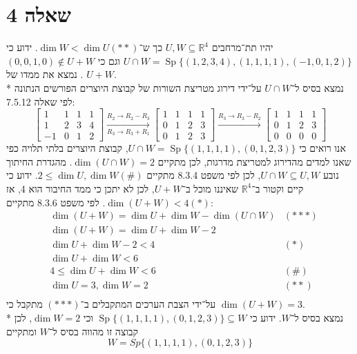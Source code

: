 \documentclass[a4paper]{article}
\DeclareMathOperator\Sp{Sp}
\def\RR{\mathbb{R}}
\begin{document}
\section{שאלה 4}
יהיו תת־מרחבים $U, W \subseteq \RR^4$ כך ש־$\dim W < \dim U (**)$.
ידוע כי $U \cap W = \Sp\{(1, 2, 3, 4), (1, 1, 1, 1), (-1, 0, 1, 2)\}$
וגם כי $(0, 0, 1, 0) \not\in U + W$.
נמצא את ממדו של $U + W$. \\*
נמצא בסיס ל־$U \cap W$ על־ידי דירוג מטריצת השורות של קבוצת היוצרים
הפורשים הנתונה לפי שאלה 7.5.12:
\[
	\begin{bmatrix}
		1 & 1 & 1 & 1 \\
		1 & 2 & 3 & 4 \\
		-1 & 0 & 1 & 2
	\end{bmatrix}
	\xrightarrow[R_3 \to R_3 + R_1]{R_2 \to R_2 - R_3}
	\begin{bmatrix}
		1 & 1 & 1 & 1 \\
		0 & 1 & 2 & 3 \\
		0 & 1 & 2 & 3
	\end{bmatrix}
	\xrightarrow{R_3 \to R_3 - R_2}
	\begin{bmatrix}
		1 & 1 & 1 & 1 \\
		0 & 1 & 2 & 3 \\
		0 & 0 & 0 & 0
	\end{bmatrix}
\]
אנו רואים כי $U \cap W = \Sp\{(1, 1, 1, 1), (0, 1, 2, 3)\}$,
קבוצת היוצרים בלתי תלויה כפי שאנו למדים מהדירוג למטריצת מדרגות,
לכן מתקיים $\dim(U \cap W) = 2$.
מהגדרת החיתוך נובע $U \cap W \subseteq U, W$,
לכן לפי משפט 8.3.4 מתקיים $2 \le \dim U, \dim W (\#)$.
ידוע כי קיים  וקטור ב־$\RR^4$ שאיננו מוכל ב־$U + W$,
לכן לא יתכן כי ממד החיבור הוא 4, אז $\dim(U + W) < 4 (*)$.
לפי משפט 8.3.6 מתקיים:
\[
	\begin{aligned}
		& \dim(U + W) = \dim U + \dim W - \dim(U \cap W) & (***) \\
		& \dim(U + W) = \dim U + \dim W - 2 \\
		& \dim U + \dim W - 2 < 4 & (*) \\
		& \dim U + \dim W < 6 \\
		& 4 \le \dim U + \dim W < 6 & (\#) \\
		& \dim U = 3, \dim W = 2 & (**) \\
	\end{aligned}
\]
על־ידי הצבת הערכים המתקבלים ב־$(***)$ מתקבל כי $\dim(U + W) = 3$. \\*
נמצא בסיס ל־$W$. ידוע כי $\Sp\{(1,1,1,1), (0, 1, 2, 3)\} \subseteq W$
וכי $\dim W = 2$, לכן קבוצה זו מהווה בסיס ל־$W$ ומתקיים
\[
	W = Sp\{(1,1,1,1), (0, 1, 2, 3)\}
\]
\end{document}
